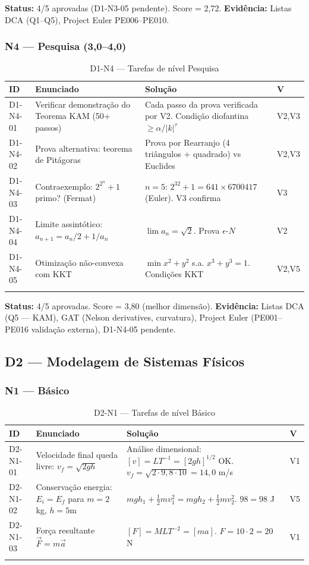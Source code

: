 \documentclass[12pt,a4paper,oneside]{article}
\begin{document}
\textbf{Status:} 4/5 aprovadas (D1-N3-05 pendente). Score = 2,72.
\textbf{Evidência:} Listas DCA (Q1--Q5), Project Euler PE006--PE010.

\subsubsection{N4 — Pesquisa (3,0--4,0)}

\begin{longtable}{p{}p{}p{}p{}}
\toprule
\textbf{ID} & \textbf{Enunciado} & \textbf{Solução} & \textbf{V} \\
\midrule
D1-N4-01 & Verificar demonstração do Teorema KAM (50+ passos) & Cada passo da prova verificada por V2. Condição diofantina $\geq\alpha/|k|^\tau$ & V2,V3 \\
D1-N4-02 & Prova alternativa: teorema de Pitágoras & Prova por Rearranjo (4 triângulos + quadrado) vs Euclides & V2,V3 \\
D1-N4-03 & Contraexemplo: $2^{2^n}+1$ primo? (Fermat) & $n=5$: $2^{32}+1=641\times6700417$ (Euler). V3 confirma & V3 \\
D1-N4-04 & Limite assintótico: $a_{n+1}=a_n/2+1/a_n$ & $\lim a_n = \sqrt{2}$. Prova $\epsilon$-$N$ & V2 \\
D1-N4-05 & Otimização não-convexa com KKT & $\min x^2+y^2$ s.a. $x^3+y^3=1$. Condições KKT & V2,V5 \\
\bottomrule
\caption{D1-N4 — Tarefas de nível Pesquisa}
\end{longtable}

\textbf{Status:} 4/5 aprovadas. Score = 3,80 (melhor dimensão).
\textbf{Evidência:} Listas DCA (Q5 — KAM), GAT (Nelson derivatives, curvatura),
Project Euler (PE001--PE016 validação externa), D1-N4-05 pendente.

\subsection{D2 — Modelagem de Sistemas Físicos}

\subsubsection{N1 — Básico}

\begin{longtable}{p{}p{}p{}p{}}
\toprule
\textbf{ID} & \textbf{Enunciado} & \textbf{Solução} & \textbf{V} \\
\midrule
D2-N1-01 & Velocidade final queda livre: $v_f=\sqrt{2gh}$ & Análise dimensional: $[v]=LT^{-1}=[2gh]^{1/2}$ OK. $v_f=\sqrt{2\cdot9{,}8\cdot10}=14{,}0$ m/s & V1 \\
D2-N1-02 & Conservação energia: $E_i=E_f$ para $m=2$kg, $h=5$m & $mgh_1+\frac{1}{2}mv_1^2=mgh_2+\frac{1}{2}mv_2^2$. $98=98$ J & V5 \\
D2-N1-03 & Força resultante $\vec{F}=m\vec{a}$ & $[F]=MLT^{-2}=[ma]$. $F=10\cdot 2=20$ N & V1 \\
\bottomrule
\caption{D2-N1 — Tarefas de nível Básico}
\end{longtable}
\end{document}

